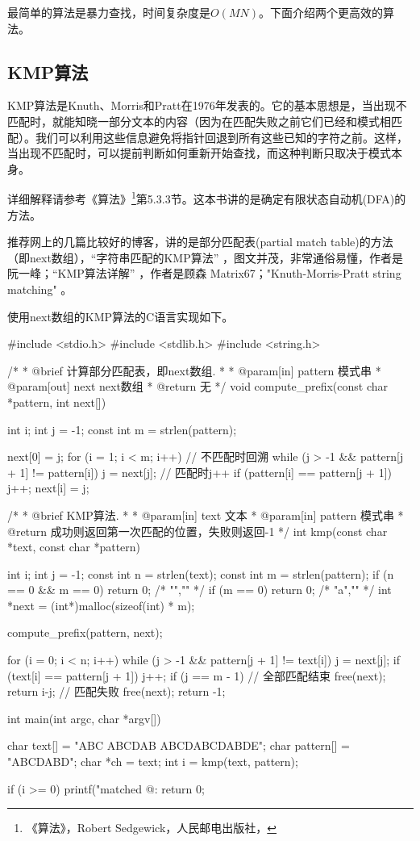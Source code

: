 最简单的算法是暴力查找，时间复杂度是$O(MN)$。下面介绍两个更高效的算法。


\subsection{KMP算法}
KMP算法是Knuth、Morris和Pratt在1976年发表的。它的基本思想是，当出现不匹配时，就能知晓一部分文本的内容（因为在匹配失败之前它们已经和模式相匹配）。我们可以利用这些信息避免将指针回退到所有这些已知的字符之前。这样，当出现不匹配时，可以提前判断如何重新开始查找，而这种判断只取决于模式本身。

详细解释请参考《算法》\footnote{《算法》，Robert Sedgewick，人民邮电出版社，}第5.3.3节。这本书讲的是确定有限状态自动机(DFA)的方法。

推荐网上的几篇比较好的博客，讲的是部分匹配表(partial match table)的方法（即next数组），“字符串匹配的KMP算法” ，图文并茂，非常通俗易懂，作者是阮一峰；“KMP算法详解” ，作者是顾森 Matrix67；"Knuth-Morris-Pratt string matching" 。

使用next数组的KMP算法的C语言实现如下。
\begin{Codex}[label=kmp.c]
#include <stdio.h>
#include <stdlib.h>
#include <string.h>

/*
 * @brief 计算部分匹配表，即next数组.
 *
 * @param[in] pattern 模式串
 * @param[out] next next数组
 * @return 无
 */
void compute_prefix(const char *pattern, int next[]) {
    int i;
    int j = -1;
    const int m = strlen(pattern);

    next[0] = j;
    for (i = 1; i < m; i++) {
        // 不匹配时回溯
        while (j > -1 && pattern[j + 1] != pattern[i]) j = next[j];
        // 匹配时j++
        if (pattern[i] == pattern[j + 1]) j++;
        next[i] = j;
    }
}

/*
 * @brief KMP算法.
 *
 * @param[in] text 文本
 * @param[in] pattern 模式串
 * @return 成功则返回第一次匹配的位置，失败则返回-1
 */
int kmp(const char *text, const char *pattern) {
    int i;
    int j = -1;
    const int n = strlen(text);
    const int m = strlen(pattern);
    if (n == 0 && m == 0) return 0; /* "","" */
    if (m == 0) return 0;  /* "a","" */
    int *next = (int*)malloc(sizeof(int) * m);

    compute_prefix(pattern, next);

    for (i = 0; i < n; i++) {
        while (j > -1 && pattern[j + 1] != text[i]) j = next[j];
        if (text[i] == pattern[j + 1]) j++;
        if (j == m - 1) { // 全部匹配结束
            free(next);
            return i-j;
        }
    }
    // 匹配失败
    free(next);
    return -1;
}


int main(int argc, char *argv[]) {
    char text[] = "ABC ABCDAB ABCDABCDABDE";
    char pattern[] = "ABCDABD";
    char *ch = text;
    int i = kmp(text, pattern);

    if (i >= 0) printf("matched @: %
    return 0;
}
\end{Codex}

